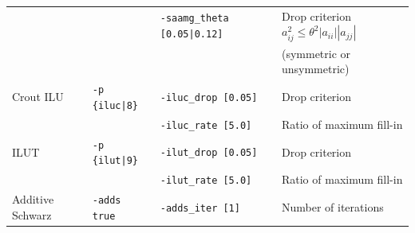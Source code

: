 \documentclass[a4paper]{article}
\begin{document}
\begin{minipage}[t]{\textwidth}
\begin{center}
\begin{tabular}{l|lll}
         &                       & \verb=-saamg_theta [0.05|0.12]= & Drop criterion $a^2_{ij}\le\theta^2|a_{ii}||a_{jj}|$ \\
         &                       &                             & (symmetric or unsymmetric) \\
Crout ILU& \verb=-p {iluc|8}=    & \verb=-iluc_drop [0.05]=    & Drop criterion    \\
         &                       & \verb=-iluc_rate [5.0]=     & Ratio of maximum fill-in \\
ILUT     & \verb=-p {ilut|9}=    & \verb=-ilut_drop [0.05]=    & Drop criterion    \\
         &                       & \verb=-ilut_rate [5.0]=     & Ratio of maximum fill-in \\
Additive Schwarz  & \verb=-adds true=   &  \verb=-adds_iter [1]= & Number of iterations   \\
\hline         
\end{tabular}
\end{center}
\end{minipage}
\\ \\
\end{document}
